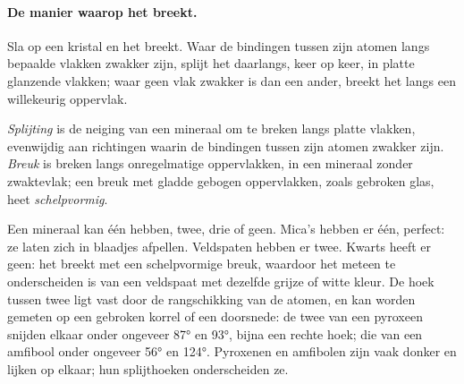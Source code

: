 \paragraph{De manier waarop het breekt.} Sla op een kristal en het breekt. Waar de
bindingen tussen zijn atomen langs bepaalde vlakken zwakker zijn, splijt het daarlangs,
keer op keer, in platte glanzende vlakken; waar geen vlak zwakker is
dan een ander, breekt het langs een willekeurig oppervlak.

\begin{definition}\label{def:g11:minerals:cleavage}
\emph{Splijting} is de neiging van een mineraal
om te breken langs platte vlakken, evenwijdig aan richtingen waarin de bindingen
tussen zijn atomen zwakker zijn. \emph{Breuk}
is breken langs onregelmatige oppervlakken, in een mineraal zonder
zwaktevlak; een breuk met gladde gebogen oppervlakken, zoals gebroken glas, heet
\emph{schelpvormig}.
\end{definition}

Een mineraal kan één  hebben, twee, drie of geen. Mica's hebben er één, perfect:
ze laten zich in blaadjes afpellen. Veldspaten hebben er twee. Kwarts heeft er geen: het breekt met een
schelpvormige breuk, waardoor het meteen te onderscheiden is van een veldspaat met dezelfde grijze
of witte kleur. De hoek tussen twee  ligt vast door de rangschikking
van de atomen, en kan worden gemeten op een gebroken korrel of een doorsnede: de twee
 van een pyroxeen snijden elkaar onder ongeveer \ang{87} en \ang{93}, bijna een rechte
hoek; die van een amfibool onder ongeveer \ang{56} en \ang{124}. Pyroxenen en
amfibolen zijn vaak donker en lijken op elkaar; hun splijthoeken onderscheiden ze.


